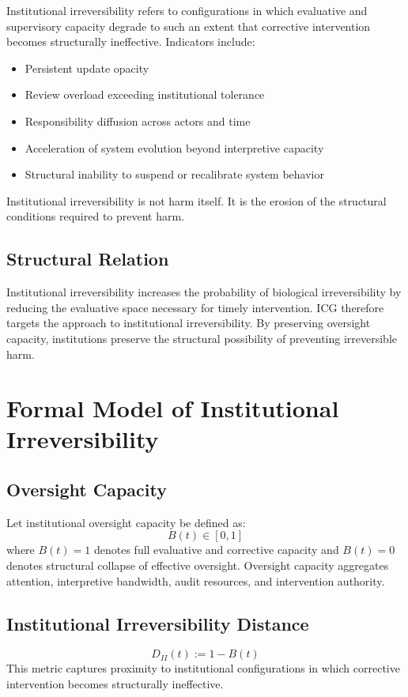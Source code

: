 \documentclass[12pt]{article}
\begin{document}
Institutional irreversibility refers to configurations in which evaluative and supervisory
capacity degrade to such an extent that corrective intervention becomes structurally
ineffective. Indicators include:

\begin{itemize}[leftmargin=1.5em]
  \item Persistent update opacity
  \item Review overload exceeding institutional tolerance
  \item Responsibility diffusion across actors and time
  \item Acceleration of system evolution beyond interpretive capacity
  \item Structural inability to suspend or recalibrate system behavior
\end{itemize}

Institutional irreversibility is not harm itself. It is the erosion of the structural
conditions required to prevent harm.

\subsection{Structural Relation}

Institutional irreversibility increases the probability of biological irreversibility by
reducing the evaluative space necessary for timely intervention. ICG therefore targets
the approach to institutional irreversibility. By preserving oversight capacity, institutions
preserve the structural possibility of preventing irreversible harm.

\section{Formal Model of Institutional Irreversibility}

\subsection{Oversight Capacity}

Let institutional oversight capacity be defined as:
\[
B(t) \in [0,1]
\]
where $B(t) = 1$ denotes full evaluative and corrective capacity and $B(t) = 0$ denotes
structural collapse of effective oversight. Oversight capacity aggregates attention,
interpretive bandwidth, audit resources, and intervention authority.

\subsection{Institutional Irreversibility Distance}
\[
D_{II}(t) := 1 - B(t)
\]
This metric captures proximity to institutional configurations in which corrective
intervention becomes structurally ineffective.
\end{document}
